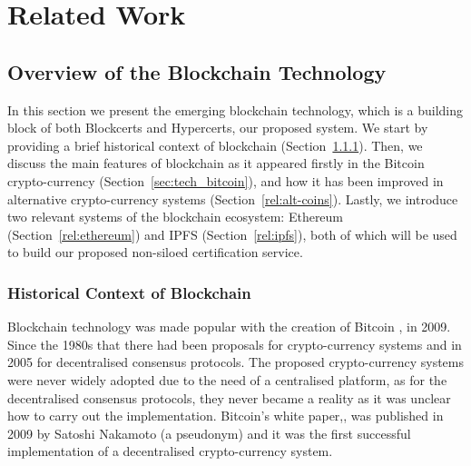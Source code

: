
\section{Related Work}



\subsection{Overview of the Blockchain Technology}
\label{rel:bitcoin}

\noindent In this section we present the emerging blockchain technology, which is a building block of both Blockcerts and Hypercerts, our proposed system. We start by providing a brief historical context of blockchain (Section~\ref{sec:hist}). Then, we discuss the main features of blockchain as it appeared firstly in the Bitcoin crypto-currency (Section~\ref{sec:tech_bitcoin}), and how it has been improved in alternative crypto-currency systems (Section~\ref{rel:alt-coins}). Lastly, we introduce two relevant systems of the blockchain ecosystem: Ethereum (Section~\ref{rel:ethereum}) and IPFS (Section~\ref{rel:ipfs}), both of which will be used to build our proposed non-siloed certification service.

\subsubsection{Historical Context of Blockchain}
\label{sec:hist}

Blockchain technology was made popular with the creation of Bitcoin \cite{Anonymous:JOJGrvgg}, in 2009. Since the 1980s that there had been proposals for crypto-currency systems and in 2005 for decentralised consensus protocols. The proposed crypto-currency systems were never widely adopted due to the need of a centralised platform, as for the decentralised consensus protocols, they never became a reality as it was unclear how to carry out the implementation. Bitcoin's white paper,\cite{Anonymous:JOJGrvgg}, was published in 2009 by Satoshi Nakamoto (a pseudonym) and it was the first successful implementation of a decentralised crypto-currency system.

